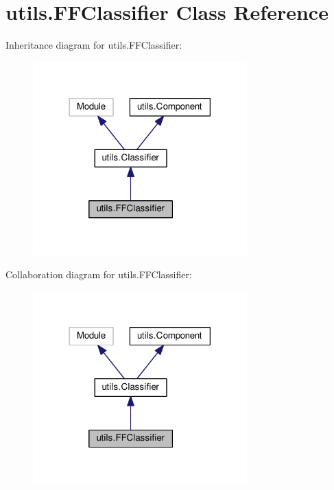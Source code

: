 \hypertarget{classutils_1_1FFClassifier}{}\section{utils.\+F\+F\+Classifier Class Reference}
\label{classutils_1_1FFClassifier}


Inheritance diagram for utils.\+F\+F\+Classifier\+:
\nopagebreak
\begin{figure}[H]
\begin{center}
\leavevmode
\includegraphics[width=234pt]{classutils_1_1FFClassifier__inherit__graph}
\end{center}
\end{figure}


Collaboration diagram for utils.\+F\+F\+Classifier\+:
\nopagebreak
\begin{figure}[H]
\begin{center}
\leavevmode
\includegraphics[width=234pt]{classutils_1_1FFClassifier__coll__graph}
\end{center}
\end{figure}
